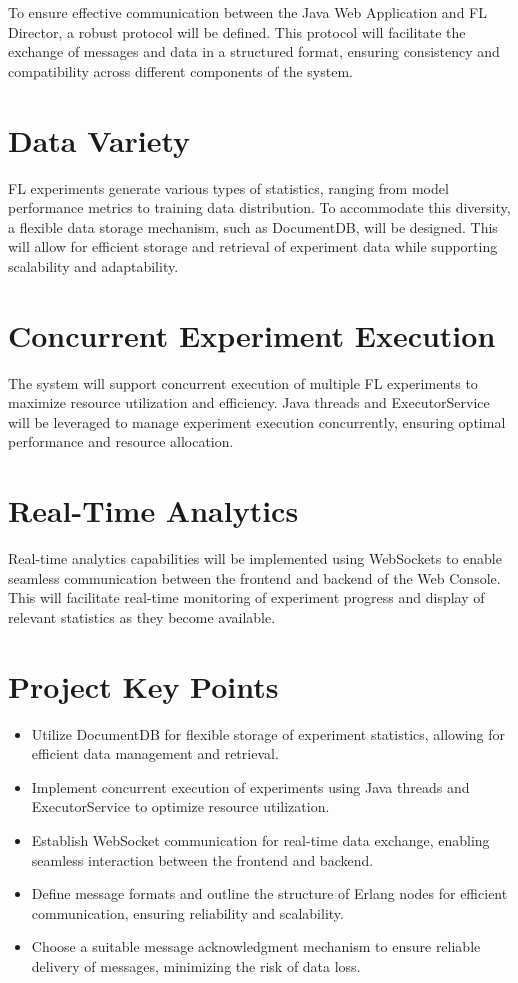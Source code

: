 To ensure effective communication between the Java Web Application and FL Director, a robust protocol will be defined. This protocol will facilitate the exchange of messages and data in a structured format, ensuring consistency and compatibility across different components of the system.

\section{Data Variety}

FL experiments generate various types of statistics, ranging from model performance metrics to training data distribution. To accommodate this diversity, a flexible data storage mechanism, such as DocumentDB, will be designed. This will allow for efficient storage and retrieval of experiment data while supporting scalability and adaptability.

\section{Concurrent Experiment Execution}

The system will support concurrent execution of multiple FL experiments to maximize resource utilization and efficiency. Java threads and ExecutorService will be leveraged to manage experiment execution concurrently, ensuring optimal performance and resource allocation.

\section{Real-Time Analytics}

Real-time analytics capabilities will be implemented using WebSockets to enable seamless communication between the frontend and backend of the Web Console. This will facilitate real-time monitoring of experiment progress and display of relevant statistics as they become available.

\section{Project Key Points}

\begin{itemize}
    \item Utilize DocumentDB for flexible storage of experiment statistics, allowing for efficient data management and retrieval.
    \item Implement concurrent execution of experiments using Java threads and ExecutorService to optimize resource utilization.
    \item Establish WebSocket communication for real-time data exchange, enabling seamless interaction between the frontend and backend.
    \item Define message formats and outline the structure of Erlang nodes for efficient communication, ensuring reliability and scalability.
    \item Choose a suitable message acknowledgment mechanism to ensure reliable delivery of messages, minimizing the risk of data loss.
\end{itemize}

